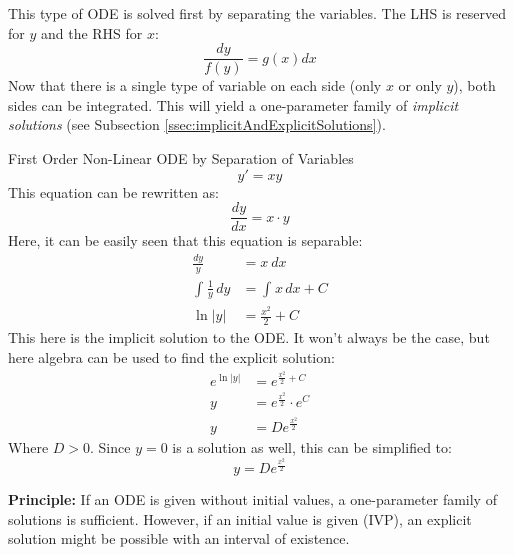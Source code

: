 \documentclass[12pt]{article}
\begin{document}
This type of ODE is solved first by separating the variables. The LHS is reserved for $y$ and the RHS for $x$:
\begin{equation*}
  \frac{dy}{f(y)} = g(x) dx
\end{equation*}
Now that there is a single type of variable on each side (only $x$ or only $y$), both sides can be integrated. This will yield a one-parameter family of \textit{implicit solutions} (see Subsection \ref{ssec:implicitAndExplicitSolutions}).
\begin{example}{First Order Non-Linear ODE by Separation of Variables}
  \begin{equation*}
    y' = xy
  \end{equation*}
  This equation can be rewritten as:
  \begin{equation*}
    \frac{dy}{dx} = x \cdot y
  \end{equation*}
  Here, it can be easily seen that this equation is separable:
  \begin{align*}
    \frac{dy}{y} &= x\ dx \\
    \int_{}^{} \frac{1}{y} \, dy &= \int_{}^{} x \, dx + C \\
    \ln|y| &= \frac{x^2}{2} + C
  \end{align*}
  This here is the implicit solution to the ODE. It won't always be the case, but here algebra can be used to find the explicit solution:
  \begin{align*}
    e^{\ln|y|} &= e^{\frac{x^2}{2} + C} \\
    y &= e^{\frac{x^2}{2}} \cdot e^{C} \\
    y &= De^{\frac{x^2}{2}}
  \end{align*}
  Where $D>0$. Since $y=0$ is a solution as well, this can be simplified to:
  \begin{equation*}
    y = De^{\frac{x^2}{2}}
  \end{equation*}
\end{example}

\textbf{Principle:} If an ODE is given without initial values, a one-parameter family of solutions is sufficient. However, if an initial value is given (IVP), an explicit solution might be possible with an interval of existence.
\end{document}
